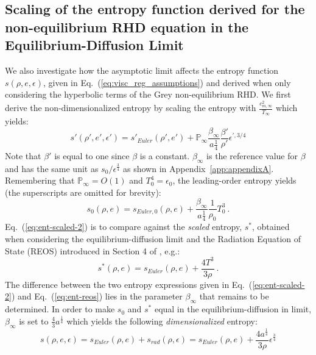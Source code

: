 \documentclass[review]{elsarticle}
\newcommand{\eqt}[1]{Eq.~(\ref{#1})}                     %
\newcommand{\app}[1]{Appendix~\ref{#1}}                     %
\renewcommand{\Re}{\textrm{Re}}
\renewcommand{\Re}{\mathbb{P}_\infty}
\newcommand{\tcr}[1]{\textcolor{red}{#1}}
\newcommand{\tcb}[1]{\textcolor{blue}{#1}}
\begin{document}
\subsection{Scaling of the entropy function derived for the non-equilibrium RHD equation in the Equilibrium-Diffusion Limit}\label{sect:ent-asym-limit}
%
We also investigate how the asymptotic limit affects the entropy function $s(\rho, e, \epsilon)$, given in \eqt{eq:visc_reg_assumptions} and derived when only considering the hyperbolic terms of the Grey non-equilibrium RHD. We first derive the non-dimensionalized entropy by scaling the entropy with $\frac{c_{m,\infty}^2}{T_\infty}$ which yields:
%
\begin{equation}\label{eq:ent-scaled}
s' \left( \rho', e', \epsilon' \right) = s'_{Euler} \left( \rho', e' \right)+ \Re \frac{\beta_\infty}{a\frac{1}{4}} \frac{\beta'}{\rho'} \epsilon^{\prime,3/4}
\end{equation}
%
Note that $\beta'$ is equal to one since $\beta$ is a constant. $\beta_\infty$ is the reference value for $\beta$ and has the same unit as $s_0 / \epsilon^\frac{3}{4}$ as shown in \app{app:appendixA}. Remembering that $\Re = O(1)$ and $T_0^4 = \epsilon_0$, the leading-order entropy yields (the superscripts are omitted for brevity):
%
\begin{equation}\label{eq:ent-scaled-2}
s_0 \left( \rho, e \right) = s_{Euler,0}\left( \rho, e \right) + \frac{\beta_\infty}{a\frac{1}{4}} \frac{1}{\rho_0} T_0^3 \ .
\end{equation}
%
\eqt{eq:ent-scaled-2} is to compare against the \emph{scaled} entropy, $s^*$, obtained when considering the equilibrium-diffusion limit and the Radiation Equation of State (REOS) introduced in Section 4 of \cite{LowrieMorel}, e.g.:
%
\begin{equation}\label{eq:ent-reos}
s^*(\rho,e) = s_{Euler}(\rho,e) + \frac{4T^3}{3\rho} \ .
\end{equation}
%
The difference between the two entropy expressions given in \eqt{eq:ent-scaled-2} and \eqt{eq:ent-reos} lies in the parameter $\beta_\infty$ that remains to be determined. In order to make $s_0$ and $s^*$ equal in the equilibrium-diffusion in limit, $\beta_\infty$ is set to $\frac{4}{3} a^\frac{1}{4}$ which yields the following \emph{dimensionalized} entropy:
%
\begin{equation}\label{eq:entropy}
s \left( \rho, e, \epsilon \right) = s_{Euler}\left( \rho, e \right) + s_{rad}(\rho,\epsilon)= s_{Euler}\left( \rho, e \right) + \frac{4a^\frac{1}{4}}{3\rho} \epsilon^\frac{3}{4}
\end{equation}
\end{document}
